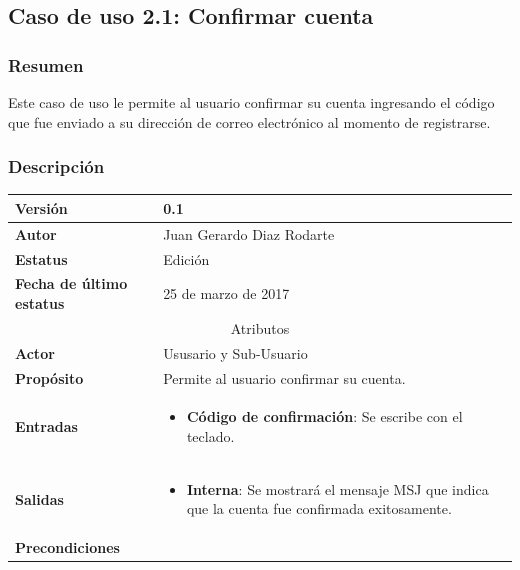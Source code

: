 \subsection{Caso de uso 2.1: Confirmar cuenta} \label{cu2_1}
\subsubsection{Resumen}
Este caso de uso le permite al usuario confirmar su cuenta ingresando el código que fue enviado a su dirección de correo electrónico al momento de registrarse.
\subsubsection{Descripción}
\begingroup
\setlength{\LTleft}{-10cm plus -1fill}
\setlength{\LTright}{\LTleft}
\begin{center}
  \addtocounter{table}{-1}
     \label{tab:cu2_1_tab}
  \begin{longtable}{| p{3.5cm} | p{11.5cm} |}
        \hline
      	\textbf{Versión} &  0.1 \\
        \hline 
       	\textbf{Autor} & Juan Gerardo Diaz Rodarte\\
        \hline
          \textbf{Estatus} & Edición \\
        \hline  
          \textbf{Fecha de último estatus} & 25 de marzo de 2017 \\
        \hline
      \multicolumn{2}{|c|}{\large{Atributos}} \\
        \hline
          \textbf{Actor} & Ususario y Sub-Usuario \\
        \hline	
          \textbf{Propósito} &  Permite al usuario confirmar su cuenta. \\
        \hline	
          \textbf{Entradas} &
	  \begin{itemize}
	    \item \textbf{Código de confirmación}: Se escribe con el teclado.
	  \end{itemize} \\
        \hline	
          \textbf{Salidas} & 
            \begin{itemize}
              \item \textbf{Interna}: Se mostrará el mensaje MSJ que indica que la cuenta fue confirmada exitosamente.
            \end{itemize} \\
        \hline	
          \textbf{Precondiciones} & 
            \begin{itemize}

\end{itemize}
\end{longtable}
\end{center}
